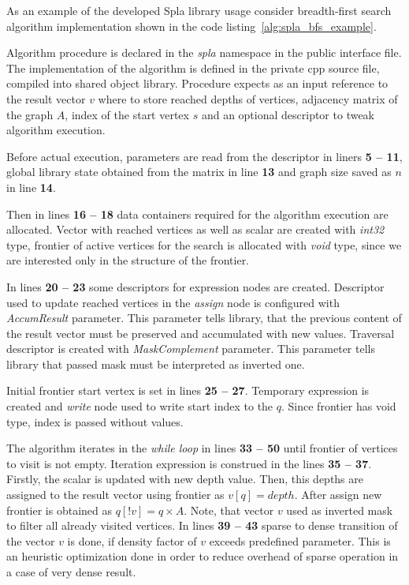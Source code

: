 As an example of the developed Spla library usage consider breadth-first search algorithm implementation shown in the code listing~\ref{alg:spla_bfs_example}. 

Algorithm procedure is declared in the \textit{spla} namespace in the public interface file. The implementation of the algorithm is defined in the private cpp source file, compiled into shared object library. Procedure expects as an input reference to the result vector $v$ where to store reached depths of vertices, adjacency matrix of the graph $A$, index of the start vertex $s$ and an optional descriptor to tweak algorithm execution.

Before actual execution, parameters are read from the descriptor in liners \textbf{5 -- 11}, global library state obtained from the matrix in line \textbf{13} and graph size saved as $n$ in line \textbf{14}.

Then in lines \textbf{16 -- 18} data containers required for the algorithm execution are allocated. Vector with reached vertices as well as scalar are created with \textit{int32} type, frontier of active vertices for the search is allocated with \textit{void} type, since we are interested only in the structure of the frontier.

In lines \textbf{20 -- 23} some descriptors for expression nodes are created. Descriptor used to update reached vertices in the \textit{assign} node is configured with \textit{AccumResult} parameter. This parameter tells library, that the previous content of the result vector must be preserved and accumulated with new values. Traversal descriptor is created with \textit{MaskComplement} parameter. This parameter tells library that passed mask must be interpreted as inverted one.

Initial frontier start vertex is set in lines \textbf{25 -- 27}. Temporary expression is created and \textit{write} node used to write start index to the $q$. Since frontier has void type, index is passed without values.

The algorithm iterates in the \textit{while loop} in lines \textbf{33 -- 50} until frontier of vertices to visit is not empty. Iteration expression is construed in the lines \textbf{35 -- 37}. Firstly, the scalar is updated with new depth value. Then, this depths are assigned to the result vector using frontier as $v[q] = depth$. After assign new frontier is obtained as $q[!v] = q \times A$. Note, that vector $v$ used as inverted mask to filter all already visited vertices. In lines \textbf{39 -- 43} sparse to dense transition of the vector $v$ is done, if density factor of $v$ exceeds predefined parameter. This is an heuristic optimization done in order to reduce overhead of sparse operation in a case of very dense result.

